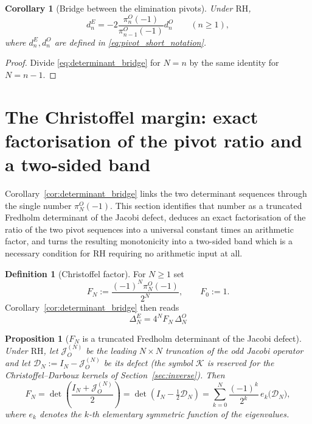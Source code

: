 \documentclass[preprint,12pt]{elsarticle}
\numberwithin{equation}{section}
\theoremstyle{plain}
\newtheorem{proposition}[theorem]{Proposition}
\newtheorem{corollary}[theorem]{Corollary}
\theoremstyle{definition}
\newtheorem{definition}[theorem]{Definition}
\theoremstyle{remark}
\newcommand{\RH}{\mathrm{RH}}
\begin{document}
\begin{corollary}[Bridge between the elimination pivots]
\label{cor:pivot_bridge}
Under $\RH$,
\begin{equation}
d_n^E
=-2\frac{\pi_n^O(-1)}{\pi_{n-1}^O(-1)}d_n^O
\qquad(n\ge1),
\label{eq:pivot_bridge}
\end{equation}
where $d_n^E,d_n^O$ are defined in \eqref{eq:pivot_short_notation}.
\end{corollary}

\begin{proof}
Divide \eqref{eq:determinant_bridge} for $N=n$ by the same identity for $N=n-1$.
\end{proof}


\section{The Christoffel margin: exact factorisation of the pivot ratio and a two-sided band}
\label{sec:christoffel_bridge}

Corollary~\ref{cor:determinant_bridge} links the two determinant sequences through the
single number $\pi_N^O(-1)$.  This section identifies that number as a truncated Fredholm
determinant of the Jacobi defect, deduces an exact factorisation of the ratio of the two
pivot sequences into a universal constant times an arithmetic factor, and turns the
resulting monotonicity into a two-sided band which is a necessary condition for $\RH$
requiring no arithmetic input at all.

\begin{definition}[Christoffel factor]
\label{def:christoffel_factor}
For $N\ge1$ set
\begin{equation}
 F_N:=\frac{(-1)^N\pi_N^O(-1)}{2^N},
 \qquad F_0:=1 .
 \label{eq:FN_definition}
\end{equation}
Corollary~\ref{cor:determinant_bridge} then reads
\begin{equation}
 \boxed{\;\Delta_N^E=4^N F_N\,\Delta_N^O\;}
 \label{eq:determinant_bridge_normalized}
\end{equation}
\end{definition}

\begin{proposition}[$F_N$ is a truncated Fredholm determinant of the Jacobi defect]
\label{prop:FN_spectral}
Under $\RH$, let $\mathcal J_O^{(N)}$ be the leading $N\times N$ truncation of the odd Jacobi
operator and let $\mathcal D_N:=I_N-\mathcal J_O^{(N)}$ be its defect (the symbol $\mathcal K$ is reserved for the Christoffel--Darboux kernels of Section~\ref{sec:inverse}).  Then
\begin{equation}
 \boxed{\;
 F_N=\det\!\left(\frac{I_N+\mathcal J_O^{(N)}}{2}\right)
 =\det\!\left(I_N-\tfrac12\mathcal D_N\right)
 =\sum_{k=0}^{N}\frac{(-1)^k}{2^k}\,e_k\bigl(\mathcal D_N\bigr),\;}
 \label{eq:FN_spectral}
\end{equation}
where $e_k$ denotes the $k$-th elementary symmetric function of the eigenvalues.
\end{proposition}
\end{document}
